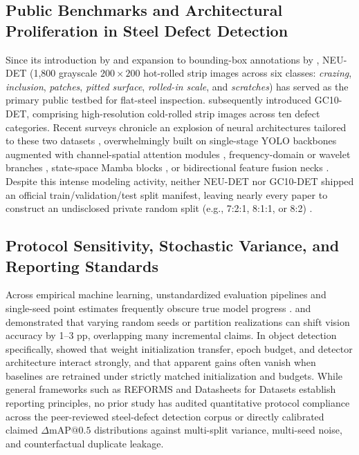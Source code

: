 \documentclass[pdflatex,sn-apa]{sn-jnl}
\begin{document}
\subsection{Public Benchmarks and Architectural Proliferation in Steel Defect Detection}
Since its introduction by \citet{song2013neu} and expansion to bounding-box annotations by \citet{he2020neu}, NEU-DET (1,800 grayscale $200\times 200$ hot-rolled strip images across six classes: \textit{crazing}, \textit{inclusion}, \textit{patches}, \textit{pitted surface}, \textit{rolled-in scale}, and \textit{scratches}) has served as the primary public testbed for flat-steel inspection. \citet{lv2020gc10} subsequently introduced GC10-DET, comprising high-resolution cold-rolled strip images across ten defect categories. Recent surveys chronicle an explosion of neural architectures tailored to these two datasets \citep{cheng2026survey}, overwhelmingly built on single-stage YOLO backbones \citep{chen2022_pmc8838028,nguyen2022_pmc9783860,zhang2023_pmc10582940,wang2025_pmc12491516,rong2026_pmc13708875,li2026dpsnet} augmented with channel-spatial attention modules \citep{woo2018cbam,ouyang2023ema,duan2026_pmc12881659,sun2026_pmc13412141}, frequency-domain or wavelet branches \citep{sun2025_pmc12298282,ge2026_pmc13004511,chen2026_pmc13562717,wei2026amfnet,liu2025sfc}, state-space Mamba blocks \citep{jin2026_pmc13280455}, or bidirectional feature fusion necks \citep{tan2020efficientdet,zhou2026_pmc13030490,xing2026_pmc13194957}. Despite this intense modeling activity, neither NEU-DET nor GC10-DET shipped an official train/validation/test split manifest, leaving nearly every paper to construct an undisclosed private random split (e.g., 7:2:1, 8:1:1, or 8:2) \citep{lema2025reproducible}.

\subsection{Protocol Sensitivity, Stochastic Variance, and Reporting Standards}
Across empirical machine learning, unstandardized evaluation pipelines and single-seed point estimates frequently obscure true model progress \citep{gundersen2018state,dodge2019show,musgrave2020reality,pineau2021improving}. \citet{picard2021torch} and \citet{bouthillier2021accounting} demonstrated that varying random seeds or partition realizations can shift vision accuracy by 1--3 pp, overlapping many incremental claims. In object detection specifically, \citet{ghahremani2026initialization} showed that weight initialization transfer, epoch budget, and detector architecture interact strongly, and that apparent gains often vanish when baselines are retrained under strictly matched initialization and budgets. While general frameworks such as REFORMS \citep{kapoor2024reforms} and Datasheets for Datasets \citep{gebru2021datasheets} establish reporting principles, no prior study has audited quantitative protocol compliance across the peer-reviewed steel-defect detection corpus or directly calibrated claimed $\Delta\text{mAP@0.5}$ distributions against multi-split variance, multi-seed noise, and counterfactual duplicate leakage.
\end{document}
